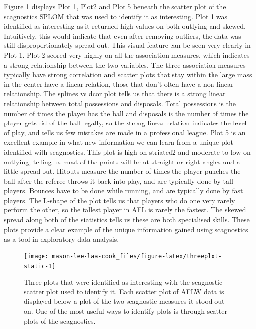 Figure \ref{fig:threeplot-static} displays Plot 1, Plot2 and Plot 5 beneath the scatter plot of the scagnostics SPLOM that was used to identify it as interesting. Plot 1 was identified as interesting as it returned high values on both outlying and skewed. Intuitively, this would indicate that even after removing outliers, the data was still disproportionately spread out. This visual feature can be seen very clearly in Plot 1. Plot 2 scored very highly on all the association measures, which indicates a strong relationship between the two variables. The three association measures typically have strong correlation and scatter plots that stay within the large mass in the center have a linear relation, those that don't often have a non-linear relationship. The splines vs dcor plot tells us that there is a strong linear relationship between total possessions and disposals. Total possessions is the number of times the player has the ball and disposals is the number of times the player gets rid of the ball legally, so the strong linear relation indicates the level of play, and tells us few mistakes are made in a professional league. Plot 5 is an excellent example in what new information we can learn from a unique plot identified with scagnostics. This plot is high on striated2 and moderate to low on outlying, telling us most of the points will be at straight or right angles and a little spread out. Hitouts measure the number of times the player punches the ball after the referee throws it back into play, and are typically done by tall players. Bounces have to be done while running, and are typically done by fast players. The L-shape of the plot tells us that players who do one very rarely perform the other, so the tallest player in AFL is rarely the fastest. The skewed spread along both of the statistics tells us these are both specialised skills. These plots provide a clear example of the unique information gained using scagnostics as a tool in exploratory data analysis.

\begin{figure}

{\centering \texttt{[image: mason-lee-laa-cook\_files/figure-latex/threeplot-static-1]} 

}

\caption{Three plots that were identified as interesting with the scagnostic scatter plot used to identify it. Each scatter plot of AFLW data is displayed below a plot of the two scagnostic measures it stood out on. One of the most useful ways to identify plots is through scatter plots of the scagnostics.}\label{fig:threeplot-static}
\end{figure}

